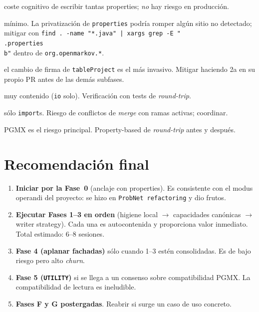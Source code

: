 \documentclass[11pt,a4paper]{article}
\newcommand{\code}[1]{\texttt{#1}}
\begin{document}
\begin{description}[leftmargin=*]
  \item[Fase 0:] coste cognitivo de escribir tantas properties; \emph{no}
        hay riesgo en producción.
  \item[Fase 1:] mínimo. La privatización de \code{properties} podría romper
        algún sitio no detectado; mitigar con \code{find . -name "*.java" |
        xargs grep -E "\\.properties\\b"} dentro de
        \code{org.openmarkov.*}.
  \item[Fase 2:] el cambio de firma de \code{tableProject} es el más
        invasivo. Mitigar haciendo 2a en su propio PR antes de las demás
        subfases.
  \item[Fase 3:] muy contenido (\code{io} solo). Verificación con tests de
        \emph{round-trip}.
  \item[Fase 4:] sólo \code{import}s. Riesgo de conflictos de \emph{merge}
        con ramas activas; coordinar.
  \item[Fase 5:] PGMX es el riesgo principal. Property-based de \emph{round-trip}
        antes y después.
\end{description}

\section{Recomendación final}

\begin{enumerate}[leftmargin=*]
  \item \textbf{Iniciar por la Fase~0} (anclaje con properties). Es
        consistente con el modus operandi del proyecto: se hizo en
        \code{ProbNet refactoring} y dio frutos.
  \item \textbf{Ejecutar Fases 1--3 en orden} (higiene local $\to$ capacidades
        canónicas $\to$ writer strategy). Cada una es autocontenida y
        proporciona valor inmediato. Total estimado: 6--8 sesiones.
  \item \textbf{Fase 4 (aplanar fachadas)} sólo cuando 1--3 estén
        consolidadas. Es de bajo riesgo pero alto \emph{churn}.
  \item \textbf{Fase 5 (\code{UTILITY})} si se llega a un consenso sobre
        compatibilidad PGMX. La compatibilidad de lectura es ineludible.
  \item \textbf{Fases F y G postergadas}. Reabrir si surge un caso de uso
        concreto.
\end{enumerate}
\end{document}
